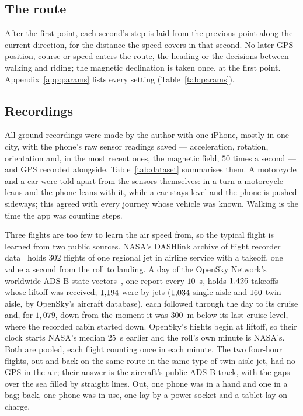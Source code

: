 \documentclass[11pt]{article}
\begin{document}
\subsection{The route}

After the first point, each second's step is laid from the previous point along the current
direction, for the distance the speed covers in that second. No later GPS position, course or speed
enters the route, the heading or the decisions between walking and riding; the magnetic
declination is taken once, at the first point. Appendix~\ref{app:params} lists every setting (Table~\ref{tab:params}).

\subsection{Recordings}\label{sec:data}

All ground recordings were made by the author with one iPhone, mostly in one city, with the phone's raw
sensor readings saved --- acceleration, rotation, orientation and, in the most recent ones, the
magnetic field, $50$ times a second --- and GPS recorded alongside. Table~\ref{tab:dataset} summarises
them. A motorcycle and a car were told apart from the sensors themselves: in a turn a motorcycle
leans and the phone leans with it, while a car stays level and the phone is pushed sideways; this
agreed with every journey whose vehicle was known. Walking is the time the app was counting steps.
\nGpsModeTxt{}

\begin{table}[t]
\centering\small
\caption{The recordings. GPS~km is the distance GPS could check ($^\dagger$the four-hour flights' are their ADS-B tracks); half-minutes are the stretches used
for speed; direction is graded in recordings with at least $50$ graded seconds.}
\label{tab:dataset}

\end{table}

Three flights are too few to learn the air speed from, so the typical flight is learned from two public
sources. NASA's DASHlink archive of flight recorder data~\cite{dashlink} holds $302$ flights of one regional
jet in airline service with a takeoff, one value a second from the roll to landing. A day of the OpenSky
Network's worldwide ADS-B state vectors~\cite{opensky}, one report every $10$~s, holds $1{,}426$ takeoffs whose
liftoff was received; $1{,}194$ were by jets ($1{,}034$ single-aisle and $160$ twin-aisle, by OpenSky's
aircraft database), each followed through the day to its cruise and, for $1{,}079$, down from the moment it
was $300$~m below its last cruise level, where the recorded cabin started down. OpenSky's flights begin at
liftoff, so their clock starts NASA's median $25$~s earlier and the roll's own minute is NASA's. Both are
pooled, each flight counting once in each minute. The two four-hour flights, out and back on the same
route in the same type of twin-aisle jet, had no GPS in the air; their answer is the aircraft's public ADS-B
track, with the gaps over the sea filled by straight lines. Out, one phone was in a hand and one in a bag;
back, one phone was in use, one lay by a power socket and a tablet lay on charge.
\end{document}
